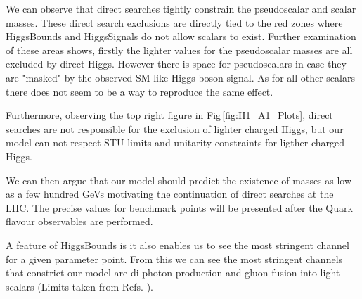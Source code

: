 \documentclass[10pt]{book}
\renewcommand{\(}{\left(}
\renewcommand{\)}{\right)}
\renewcommand{\[}{\left[}
\renewcommand{\]}{\right]}
\begin{document}
%
We can observe that direct searches tightly constrain the pseudoscalar and scalar masses. 
%
These direct search exclusions are directly tied to the red zones where HiggsBounds and HiggsSignals do not allow scalars to exist. 
%
Further examination of these areas shows, firstly the lighter values for the pseudoscalar masses are all excluded by direct Higgs. However there is space for pseudoscalars in case they are "masked" by the observed SM-like Higgs boson signal.  
%
As for all other scalars there does not seem to be a way to reproduce the same effect. 

Furthermore, observing the top right figure in Fig\,\ref{fig:H1_A1_Plots}, direct searches are not responsible for the exclusion of lighter charged Higgs, but our model can not respect STU limits and unitarity constraints for ligther charged Higgs.  

%
We can then argue that our model should predict the existence of masses as low as a few hundred GeVs motivating the continuation of direct searches at the LHC. 
%
The precise values for benchmark points will be presented after the Quark flavour observables are performed. 



A feature of HiggsBounds is it also enables us to see the most stringent channel for a given parameter point. 
%
From this we can see the most stringent channels that constrict our model are di-photon production and gluon fusion into light scalars (Limits taken from Refs. \cite{Aad_2014,CMS-PAS-HIG-14-029,Khachatryan_2015}). 
%
%
%
\end{document}
